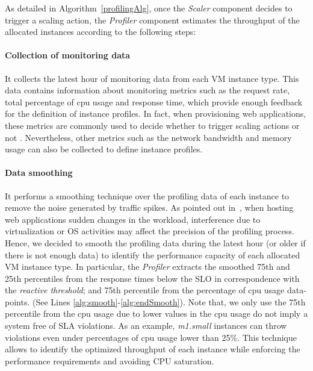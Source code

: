 As detailed in Algorithm~\ref{profilingAlg}, once the \emph{Scaler} component decides to trigger a scaling action, the \emph{Profiler} component estimates the throughput of the allocated instances according to the following steps:



\paragraph{Collection of monitoring data} It collects the latest hour of monitoring data from each VM instance type. This data contains information about monitoring metrics such as the request rate, total percentage of cpu usage and response time, which provide enough feedback for the definition of instance profiles. In fact, when provisioning web applications, these metrics are commonly used to decide whether to trigger scaling actions or not \cite{smartscale_2012,urgaonkar_agile_2008}. Nevertheless, other metrics such as the network bandwidth and memory usage can also be collected to define instance profiles.


\paragraph{Data smoothing} It performs a smoothing technique over the profiling data of each instance to remove the noise generated by traffic spikes. As pointed out in~\cite{gandhi_hybrid_2012}, when hosting web applications sudden changes in the workload, interference due to virtualization or OS activities may affect the precision of the profiling process. Hence, we decided to smooth the profiling data during the latest hour (or older if there is not enough data) to identify the performance capacity of each allocated VM instance type. In particular, the \emph{Profiler} extracts the smoothed 75th and 25th percentiles from the response times below the SLO in correspondence with the \emph{reactive threshold}; and 75th percentile from the percentage of cpu usage data-points. (See Lines \ref{alg:smooth}-\ref{alg:endSmooth}). Note that, we only use the 75th percentile from the cpu usage due to lower values in the cpu usage do not imply a system free of SLA violations. As an example, \emph{m1.small} instances can throw violations even under percentages of cpu usage lower than 25\%. This technique allows to identify the optimized throughput of each instance while enforcing the performance requirements and avoiding CPU saturation. 

